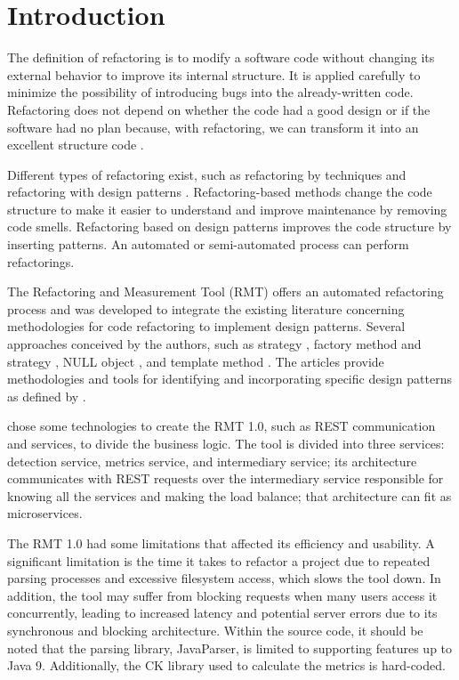 \chapter{Introduction}%
\label{chpt-intro}

The definition of refactoring is to modify a software code without changing its external behavior to improve its internal structure. It is applied carefully to minimize the possibility of introducing bugs into the already-written code. Refactoring does not depend on whether the code had a good design or if the software had no plan because, with refactoring, we can transform it into an excellent structure code \cite{fowler2018refactoring}.

Different types of refactoring exist, such as refactoring by techniques \cite{fowler2018refactoring} and refactoring with design patterns \cite{kerievsky2005refactoring}. Refactoring-based methods change the code structure to make it easier to understand and improve maintenance by removing code smells. Refactoring based on design patterns improves the code structure by inserting patterns. An automated or semi-automated process can perform refactorings.

The Refactoring and Measurement Tool (RMT) \textcite{beluzzo2018abordagem} offers an automated refactoring process and was developed to integrate the existing literature concerning methodologies for code refactoring to implement design patterns. Several approaches conceived by the authors, such as strategy \cite{CHRISTOPOULOU20121201}, factory method and strategy \cite{Liu2014}, NULL object \cite{GAITANI201533}, and template method \cite{zafeiris2017automated}. The articles provide methodologies and tools for identifying and incorporating specific design patterns as defined by \textcite{Gamma2009}.

\textcite{beluzzo2018abordagem} chose some technologies to create the RMT 1.0, such as REST communication and services, to divide the business logic. The tool is divided into three services: detection service, metrics service, and intermediary service; its architecture communicates with REST requests over the intermediary service responsible for knowing all the services and making the load balance; that architecture can fit as microservices.

The RMT 1.0 had some limitations that affected its efficiency and usability. A significant limitation is the time it takes to refactor a project due to repeated parsing processes and excessive filesystem access, which slows the tool down. In addition, the tool may suffer from blocking requests when many users access it concurrently, leading to increased latency and potential server errors due to its synchronous and blocking architecture. Within the source code, it should be noted that the parsing library, JavaParser, is limited to supporting features up to Java 9. Additionally, the CK library used to calculate the metrics is hard-coded.

